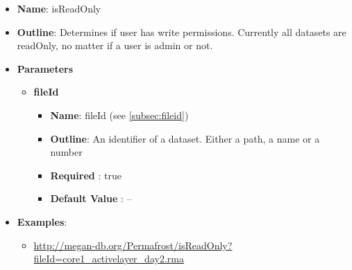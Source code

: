 \documentclass[11pt]{article}
\begin{document}
\begin{itemize}
	\item \textbf{Name}: isReadOnly
	\item \textbf{Outline}: Determines if user has write permissions. Currently all datasets are readOnly, no matter if a user is admin or not.
	\item \textbf{Parameters}
		\begin{itemize}
			\item \textbf{fileId}		
				\begin{itemize}
					\item \textbf{Name}: fileId (see \ref{subsec:fileid})
					\item \textbf{Outline}: An identifier of a dataset. Either a path, a name or a number
					\item \textbf{Required} : true
					\item \textbf{Default Value} : --
				\end{itemize}
		\end{itemize}
	\item \textbf{Examples}:
		\begin{itemize}		
			\item \url{http://megan-db.org/Permafrost/isReadOnly?fileId=core1_activelayer_day2.rma}
		\end{itemize}
\end{itemize}
\end{document}
